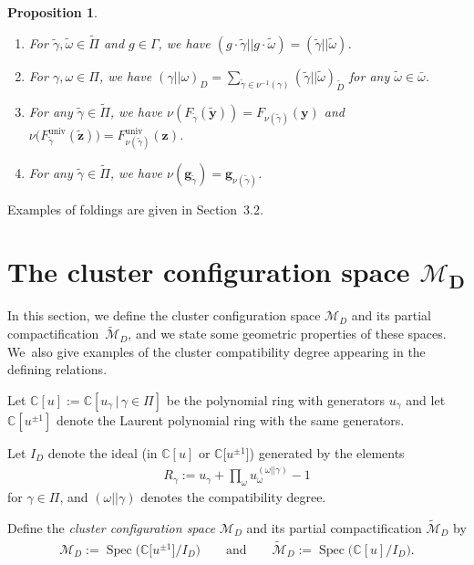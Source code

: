 \documentclass[10pt,a4paper]{amsart}
\def\C{{\mathbb C}}
\def\Spec{\operatorname{Spec}}
\def\univ{{\operatorname{univ}}}
\def\M{{\mathcal{M}}}
\def\tM{{\widetilde {\mathcal{M}}}}
\def\tD{{\tilde D}}
\def\z{{\mathbf z}}
\def\y{{\mathbf y}}
\def\g{{\mathbf g}}
\def\tgamma{{\tilde \gamma}}
\def\tPi{{\tilde \Pi}}
\numberwithin{equation}{section}
\newtheorem{Proposition}[Theorem]{Proposition}
\begin{document}
\begin{Proposition} \label{prop:folding}\
\begin{enumerate}\itemsep=0pt
\item[$1.$] For $\tgamma,\tilde \omega \in \tPi$ and $g\in \Gamma$, we have $(g \cdot \tgamma||g \cdot \tilde \omega) = (\tgamma||\tilde \omega)$.
\item[$2.$] For $\gamma,\omega \in \Pi$, we have $(\gamma || \omega)_D = \sum_{\tgamma \in \nu^{-1}(\gamma) } (\tgamma || \tilde \omega)_{\tD}$ for any $\tilde \omega \in \bar \omega$.
\item[$3.$] For any $\tgamma \in \tPi$, we have $\nu(F_{\tgamma}(\tilde \y)) = F_{\nu(\tgamma)}(\y)$ and $\nu\big(F^\univ_{\tgamma}(\tilde \z)\big) = F^\univ_{\nu(\tgamma)}(\z)$.
\item[$4.$] For any $\tgamma \in \tPi$, we have $\nu(\g_{\tgamma}) = \g_{\nu(\tgamma)}$.
\end{enumerate}
\end{Proposition}
Examples of foldings are given in Section~3.2.

\section[The cluster configuration space MD]{The cluster configuration space $\boldsymbol{\M_D}$}
In this section, we define the cluster configuration space $\M_D$ and its partial compactification~$\tM_D$, and we state some geometric properties of these spaces. We~also give examples of the cluster compatibility degree appearing in the defining relations.

\bigskip{}
Let $\C[u]:=\C[u_\gamma \,|\, \gamma \in\Pi]$ be the polynomial ring with generators $u_\gamma$ and let $\C[u^{\pm 1}]$ denote the Laurent polynomial ring with the same generators.
\begin{Definition}\label{def:ID}
Let $I_D$ denote the ideal \big(in $\C[u]$ or $\C\big[u^{\pm 1}\big]$\big) generated by the elements
\begin{gather}\label{eq:I}
R_\gamma := u_\gamma + \prod_{\omega} u_{\omega}^{(\omega||\gamma)} - 1
\end{gather}
for $\gamma \in \Pi$, and $(\omega||\gamma)$ denotes the compatibility degree.
\end{Definition}

\begin{Definition}
Define the \emph{cluster configuration space} $\M_D$ and its partial compactification $\tM_D$ by
\begin{gather*}
\M_D := \Spec\big(\C\big[u^{\pm 1}\big]/I_D\big) \qquad \text{and} \qquad
\tM_D:=\Spec\big(\C[u]/I_D\big).
\end{gather*}
\end{Definition}
\end{document}
